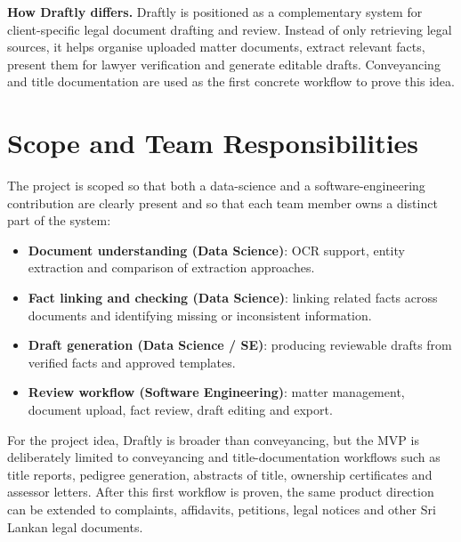 \documentclass[11pt,a4paper]{article}
\begin{document}
\noindent\textbf{How Draftly differs.} Draftly is positioned as a complementary system
for client-specific legal document drafting and review. Instead of only retrieving legal
sources, it helps organise uploaded matter documents, extract relevant facts, present
them for lawyer verification and generate editable drafts. Conveyancing and title
documentation are used as the first concrete workflow to prove this idea.

\section{Scope and Team Responsibilities}

The project is scoped so that both a data-science and a software-engineering
contribution are clearly present and so that each team member owns a distinct part of
the system:
\begin{itemize}[itemsep=0pt, topsep=0pt]
  \item \textbf{Document understanding (Data Science)}: OCR support, entity extraction
        and comparison of extraction approaches.
  \item \textbf{Fact linking and checking (Data Science)}: linking related facts across
        documents and identifying missing or inconsistent information.
  \item \textbf{Draft generation (Data Science / SE)}: producing reviewable drafts from
        verified facts and approved templates.
  \item \textbf{Review workflow (Software Engineering)}: matter management, document
        upload, fact review, draft editing and export.
\end{itemize}

For the project idea, Draftly is broader than conveyancing, but the MVP is deliberately
limited to conveyancing and title-documentation workflows such as title reports,
pedigree generation, abstracts of title, ownership certificates and assessor letters.
After this first workflow is proven, the same product direction can be extended to
complaints, affidavits, petitions, legal notices and other Sri Lankan legal documents.
\end{document}
